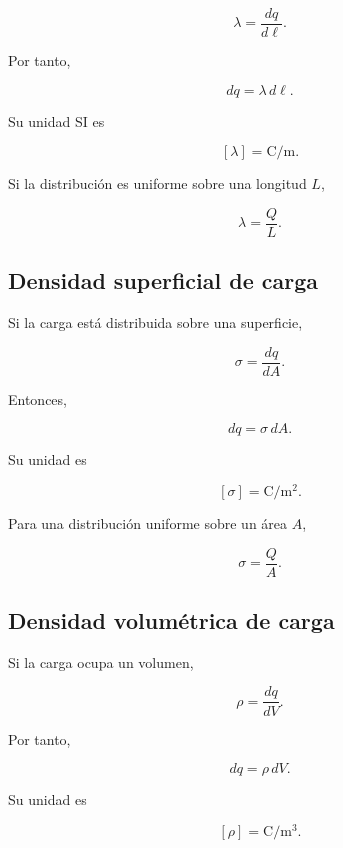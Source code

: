 \begin{equation}
\boxed{\lambda=\frac{dq}{d\ell}}.
\end{equation}

Por tanto,

\begin{equation}
\boxed{dq=\lambda\,d\ell}.
\end{equation}

Su unidad SI es

\[
\boxed{[\lambda]=\si{\coulomb\per\metre}}.
\]

Si la distribución es uniforme sobre una longitud \(L\),

\[
\boxed{\lambda=\frac{Q}{L}}.
\]


\subsection{Densidad superficial de carga}

Si la carga está distribuida sobre una superficie,

\begin{equation}
\boxed{\sigma=\frac{dq}{dA}}.
\end{equation}

Entonces,

\begin{equation}
\boxed{dq=\sigma\,dA}.
\end{equation}

Su unidad es

\[
\boxed{[\sigma]=\si{\coulomb\per\metre\squared}}.
\]

Para una distribución uniforme sobre un área \(A\),

\[
\boxed{\sigma=\frac{Q}{A}}.
\]


\subsection{Densidad volumétrica de carga}

Si la carga ocupa un volumen,

\begin{equation}
\boxed{\rho=\frac{dq}{dV}}.
\end{equation}

Por tanto,

\begin{equation}
\boxed{dq=\rho\,dV}.
\end{equation}

Su unidad es

\[
\boxed{[\rho]=\si{\coulomb\per\metre\cubed}}.
\]

